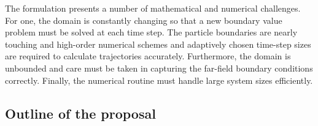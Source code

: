 
The formulation presents a number of mathematical and numerical
challenges. For one, the domain is constantly changing so that a new
boundary value problem must be solved at each time step. The particle
boundaries are nearly touching and high-order numerical
schemes and adaptively chosen time-step sizes
are required to calculate trajectories accurately.
Furthermore, the domain is unbounded and care must be taken 
in capturing the far-field boundary conditions correctly. 
Finally, the numerical routine must handle large system sizes
efficiently.



\subsection{Outline of the proposal}
